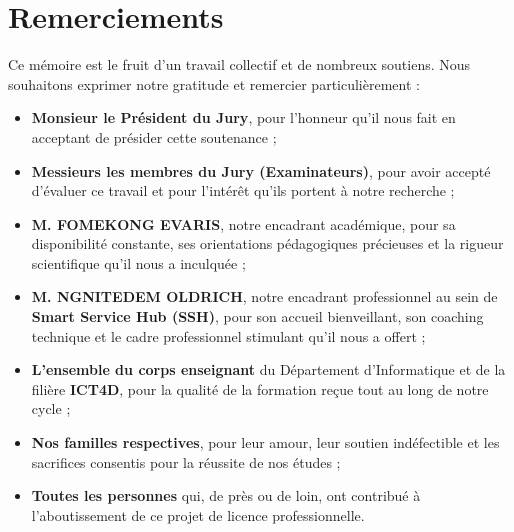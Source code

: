 
\chapter*{Remerciements}

\vspace{0.5cm}

Ce mémoire est le fruit d'un travail collectif et de nombreux soutiens. Nous souhaitons exprimer notre gratitude et remercier particulièrement :

\begin{itemize}[label=\textbullet, leftmargin=1.5cm]
    \item \textbf{Monsieur le Président du Jury}, pour l'honneur qu'il nous fait en acceptant de présider cette soutenance ;
    
    \item \textbf{Messieurs les membres du Jury (Examinateurs)}, pour avoir accepté d'évaluer ce travail et pour l'intérêt qu'ils portent à notre recherche ;

    \item \textbf{M. FOMEKONG EVARIS}, notre encadrant académique, pour sa disponibilité constante, ses orientations pédagogiques précieuses et la rigueur scientifique qu'il nous a inculquée ;

    \item \textbf{M. NGNITEDEM OLDRICH}, notre encadrant professionnel au sein de \textbf{Smart Service Hub (SSH)}, pour son accueil bienveillant, son coaching technique et le cadre professionnel stimulant qu'il nous a offert ;

    \item \textbf{L'ensemble du corps enseignant} du Département d'Informatique et de la filière \textbf{ICT4D}, pour la qualité de la formation reçue tout au long de notre cycle ;

    \item \textbf{Nos familles respectives}, pour leur amour, leur soutien indéfectible et les sacrifices consentis pour la réussite de nos études ;

    \item \textbf{Toutes les personnes} qui, de près ou de loin, ont contribué à l'aboutissement de ce projet de licence professionnelle.
\end{itemize}

\vspace{1cm}
